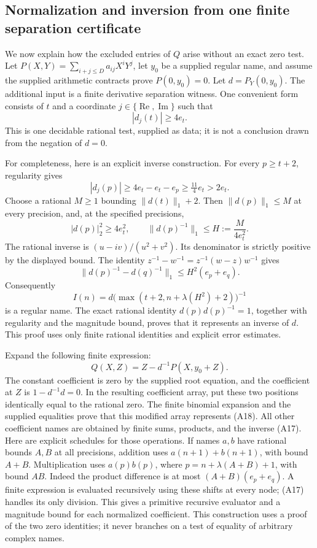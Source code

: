 \subsection{Normalization and inversion from one finite separation certificate}

We now explain how the excluded entries of \(Q\) arise without an exact
zero test. Let
\(P(X,Y)=\sum_{i+j\leq D}a_{ij}X^iY^j\), let \(y_0\) be a
supplied regular name, and assume the supplied arithmetic contracts
prove \(P(0,y_0)=0\). Let
\(d=P_Y(0,y_0)\). The additional input is a finite derivative
separation witness. One convenient form consists of \(t\) and a
coordinate \(j\in\{\operatorname{Re},\operatorname{Im}\}\) such that
\[
       |d_j(t)|\geq4e_t.
 \tag{A16}\label{eq:finite-apartness}
\]
This is one decidable rational test, supplied as data; it is not a
conclusion drawn from the negation of \(d=0\).

For completeness, here is an explicit inverse construction. For every
\(p\geq t+2\), regularity gives
\[
 |d_j(p)|\geq4e_t-e_t-e_p\geq\tfrac{11}{4}e_t>2e_t.
\]
Choose a rational \(M\geq1\) bounding
\(\lVert d(t)\rVert_1+2\). Then
\(\lVert d(p)\rVert_1\leq M\) at every precision, and, at the
specified precisions,
\[
 |d(p)|_2^2\geq4e_t^2,
 \qquad
 \lVert d(p)^{-1}\rVert_1\leq
 H:=\frac{M}{4e_t^2}.
\]
The rational inverse is
\((u-iv)/(u^2+v^2)\). Its denominator is strictly positive by the
displayed bound. The identity
\(z^{-1}-w^{-1}=z^{-1}(w-z)w^{-1}\) gives
\[
 \lVert d(p)^{-1}-d(q)^{-1}\rVert_1
             \leq H^2(e_p+e_q).
\]
Consequently
\[
 I(n)=d\bigl(\max(t+2,n+\lambda(H^2)+2)\bigr)^{-1}
 \tag{A17}\label{eq:inverse-name}
\]
is a regular name. The exact rational identity
\(d(p)d(p)^{-1}=1\), together with regularity and the magnitude
bound, proves that it represents an inverse of \(d\). This proof uses
only finite rational identities and explicit error estimates.

Expand the following finite expression:
\[
 Q(X,Z)=Z-d^{-1}P(X,y_0+Z).
 \tag{A18}\label{eq:normalized-branch}
\]
The constant coefficient is zero by the supplied root equation, and
the coefficient at \(Z\) is \(1-d^{-1}d=0\). In the resulting
coefficient array, put these two positions identically equal to the
rational zero. The finite binomial expansion and the supplied equalities
prove that this modified array represents (A18). All other coefficient
names are obtained by finite sums, products, and the inverse (A17).
Here are explicit schedules for those operations. If names \(a,b\)
have rational bounds \(A,B\) at all precisions, addition uses
\(a(n+1)+b(n+1)\), with bound \(A+B\). Multiplication uses
\(a(p)b(p)\), where \(p=n+\lambda(A+B)+1\), with bound \(AB\).
Indeed the product difference is at most
\((A+B)(e_p+e_q)\). A finite expression is evaluated recursively
using these shifts at every node; (A17) handles its only division.
This gives a primitive recursive evaluator and a magnitude bound for
each normalized coefficient. This construction
uses a proof of the two zero identities; it never branches on a test of
equality of arbitrary complex names.

